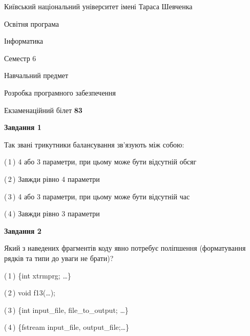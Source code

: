 \documentclass[10pt, ukrainian]{article}
\begin{document}
{{\begin {small}\par
{ \center  Київський національний університет імені Тараса Шевченка \par}
{\parbox {5 cm}{Освітня програма \hfill}{\parbox {7 cm}{Інформатика \hfill}}\parbox {6 cm}{\hfill Семестр 6}}\par
{\parbox {5 cm} {Навчальний предмет \hfill}\parbox {7 cm}{Розробка програмного забезпечення \hfill}\parbox {6cm}{\hfill}\par}\vspace{-7pt} \end{small}}{\center Екзаменаційний білет \No \textbf
{ 83 }\par}}
{
\begin {large}
{\begin {center}\textbf{Завдання 1}\end {center}}\par
Так звані трикутники балансування зв'язують між собою:\par
\vspace{2mm}



(\,1\,) 4 або 3 параметри, при цьому може бути відсутній обсяг %



(\,2\,) Завжди рівно 4 параметри%



(\,3\,) 4 або 3 параметри, при цьому може бути відсутній час%



(\,4\,) Завжди рівно 3 параметри%


{\begin {center}\textbf{Завдання 2}\end {center}}\par
Який з наведених фрагментів коду явно потребує поліпшення (форматування рядків та типи до уваги не брати)?\par
\vspace{2mm}



(\,1\,) \{int xtrmprg; …\}%



(\,2\,) void f13(…);%



(\,3\,) \{int input\_file, file\_to\_output; …\}%



(\,4\,) \{fstream input\_file, output\_file;…\} %



\end{large}}
\end{document}
